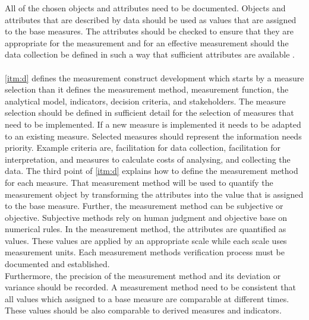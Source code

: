 All of the chosen objects and attributes need to be documented. Objects and attributes that are described by data should be used as values that are assigned to the base measures. The attributes should be checked to ensure that they are appropriate for the measurement and for an effective measurement should the data collection be defined in such a way that sufficient attributes are available \cite{ISO_27004_2009}. \\ \\
\ref{itm:d} defines the measurement construct development which starts by a measure selection than it defines the measurement method, measurement function, the analytical model, indicators, decision criteria, and stakeholders. The measure selection should be defined in sufficient detail for the selection of measures that need to be implemented. If a new measure is implemented it needs to be adapted to an existing measure. Selected measures should represent the information needs priority. Example criteria are, facilitation for data collection, facilitation for interpretation, and measures to calculate costs of analysing, and collecting the data. The third point of \ref{itm:d} explains how to define the measurement method for each measure. That measurement method will be used to quantify the measurement object by transforming the attributes into the value that is assigned to the base measure. Further, the measurement method can be subjective or objective. Subjective methods rely on human judgment and objective base on numerical rules. In the measurement method, the attributes are quantified as values. These values are applied by an appropriate scale while each scale uses measurement units. Each measurement methods verification process must be documented and established. \\
Furthermore, the precision of the measurement method and its deviation or variance should be recorded. A measurement method need to be consistent that all values which assigned to a base measure are comparable at different times. These values should be also comparable to derived measures and indicators. \\
